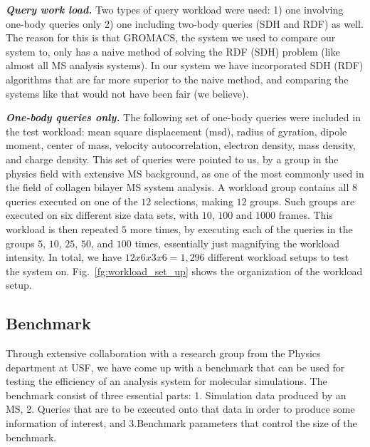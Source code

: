 \documentclass[10pt,journal,final,letterpaper,twocolumn]{IEEEtran}
\begin{document}
\emph{\textbf{Query work load.}} Two types of query workload were
used: 1) one involving one-body queries only 2) one including
two-body queries (SDH and RDF) as well. The reason for this is that
GROMACS, the system we used to compare our system to, only has a
naive method of solving the RDF (SDH) problem (like almost all MS
analysis systems). In our system we have incorporated SDH (RDF)
algorithms that are far more superior to the naive method, and
comparing the systems like that would not have been fair (we
believe).

\emph{\textbf{One-body queries only.}} The following set of one-body
queries were included in the test workload: mean square displacement
(msd), radius of gyration, dipole moment, center of mass, velocity
autocorrelation, electron density, mass density, and charge density.
This set of queries were pointed to us, by a group in the physics
field with extensive MS background, as one of the most commonly used
in the field of collagen bilayer MS system analysis. A workload
group contains all $8$ queries executed on one of the $12$
selections, making $12$ groups. Such groups are executed on six
different size data sets, with $10$, $100$ and $1000$ frames. This
workload is then repeated $5$ more times, by executing each of the
queries in the groups $5$, $10$, $25$, $50$, and $100$ times,
essentially just magnifying the workload intensity. In total, we
have $12 x 6 x 3 x 6 = 1,296$ different workload setups to test the
system on. Fig.~\ref{fg:workload_set_up} shows the organization of
the workload setup.


\subsection{Benchmark}

Through extensive collaboration with a research group from the
Physics department at USF, we have come up with a benchmark that can
be used for testing the efficiency of an analysis system for
molecular simulations. The benchmark consist of three essential
parts: 1. Simulation data produced by an MS, 2. Queries that are to
be executed onto that data in order to produce some information of
interest, and 3.Benchmark parameters that control the size of the
benchmark.
\end{document}
